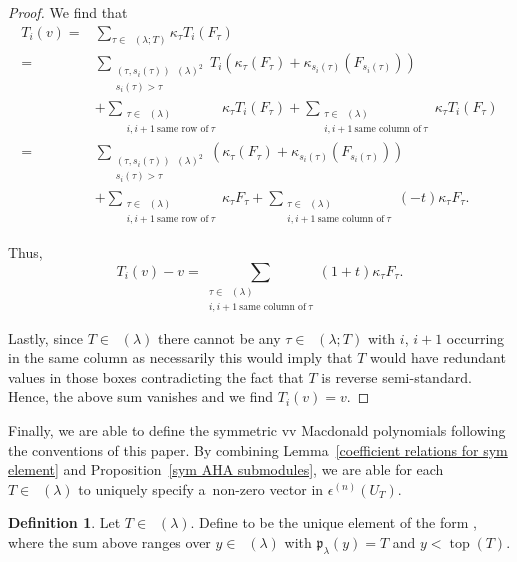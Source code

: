 \documentclass[10pt,a4paper]{amsart}
\numberwithin{equation}{section}
\theoremstyle{definition}
\newtheorem{Definition}[Theorem]{Definition}
\DeclareMathOperator{\PSYT}{\mathrm{PSYT}_{\geq 0}}
\DeclareMathOperator{\RSSYT}{\mathrm{RSSYT}_{\geq 0}}
\DeclareMathOperator{\Top}{\mathrm{top}}
\begin{document}
\begin{proof}
 We find that
 \begin{align*}
 T_i(v)
 ={}& \sum_{\tau \in \PSYT(\lambda;T)} \kappa_{\tau} T_i(F_{\tau}) \\
 ={}& \sum_{\substack{(\tau, s_i(\tau))\PSYT(\lambda)^2 \\ s_i(\tau) > \tau}}T_i\left(\kappa_{\tau} (F_{\tau}) + \kappa_{s_i(\tau)} (F_{s_i(\tau)}) \right) \\
 & + \sum_{\substack{\tau \in \PSYT(\lambda) \\ i,i+1 ~\text{same row of}~ \tau }} \kappa_{\tau} T_i(F_{\tau}) + \sum_{\substack{\tau \in \PSYT(\lambda) \\ i,i+1 ~\text{same column of}~ \tau }} \kappa_{\tau} T_i(F_{\tau}) \\
 ={}& \sum_{\substack{(\tau, s_i(\tau))\PSYT(\lambda)^2 \\ s_i(\tau) > \tau}}\left(\kappa_{\tau} (F_{\tau}) + \kappa_{s_i(\tau)} (F_{s_i(\tau)}) \right) \\
 & + \sum_{\substack{\tau \in \PSYT(\lambda) \\ i,i+1 ~\text{same row of}~ \tau }} \kappa_{\tau} F_{\tau} + \sum_{\substack{\tau \in \PSYT(\lambda) \\ i,i+1 ~\text{same column of}~ \tau }} (-t) \kappa_{\tau} F_{\tau}.
 \end{align*}

 Thus,
 \[
 T_i(v) - v = \sum_{\substack{\tau \in \PSYT(\lambda) \\ i,i+1 ~\text{same column of}~ \tau }} (1+t)\kappa_{\tau} F_{\tau}.
 \]

 Lastly, since $T \in \RSSYT(\lambda)$ there cannot be any $\tau \in \PSYT(\lambda;T)$ with $i$, $i+1$ occurring in the same column as necessarily this would imply that $T$ would have redundant values in those boxes contradicting the fact that $T$ is reverse semi-standard. Hence, the above sum vanishes and we find $T_i(v) = v$.
 \end{proof}

Finally, we are able to define the symmetric vv Macdonald polynomials following the conventions of this paper. By combining Lemma~\ref{coefficient relations for sym element} and Proposition~\ref{sym AHA submodules}, we are able for each $T \in \RSSYT(\lambda)$ to uniquely specify a~non-zero vector in $\epsilon^{(n)}(U_T)$.

\begin{Definition}\label{Macdonald polynomial def}
 Let $T \in \RSSYT(\lambda)$. Define  to be the unique element of the form
 \smash{$
 P_T = F_{\Top(T)} + \sum_{y} \kappa_{y}F_y$},
 where the sum above ranges over $y \in \PSYT(\lambda)$ with $\mathfrak{p}_{\lambda}(y) = T$ and $y < \Top(T)$.
\end{Definition}
\end{document}
